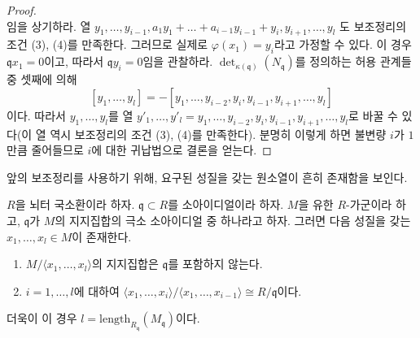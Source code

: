 \begin{proof}
$$$$
임을 상기하라. 열
$y_1, \ldots, y_{i - 1},
a_1y_1 + \ldots + a_{i - 1}y_{i - 1} + y_i, y_{i + 1}, \ldots, y_l$
도 보조정리의 조건 (3), (4)를 만족한다. 그러므로 실제로
$\varphi(x_1) = y_i$라고 가정할 수 있다. 이 경우
$\mathfrak q x_1 = 0$이고, 따라서 $\mathfrak q y_i = 0$임을
관찰하라. $\det_{\kappa(\mathfrak q)}(N_{\mathfrak q})$를 정의하는
허용 관계들 중 셋째에 의해
$$
[y_1, \ldots, y_l] =
- [y_1, \ldots, y_{i - 2}, y_i, y_{i - 1}, y_{i + 1}, \ldots, y_l]
$$
이다. 따라서 $y_1, \ldots, y_l$를 열
$y'_1, \ldots, y'_l =
y_1, \ldots, y_{i - 2}, y_i, y_{i - 1}, y_{i + 1}, \ldots, y_l$로
바꿀 수 있다(이 열 역시 보조정리의 조건 (3), (4)를 만족한다).
분명히 이렇게 하면 불변량 $i$가 $1$만큼 줄어들므로 $i$에 대한
귀납법으로 결론을 얻는다.
\end{proof}

\noindent
앞의 보조정리를 사용하기 위해, 요구된 성질을 갖는 원소열이 흔히
존재함을 보인다.

\begin{lemma}
\label{lemma-good-sequence-exists}
$R$을 뇌터 국소환이라 하자. $\mathfrak q \subset R$를
소아이디얼이라 하자. $M$을 유한 $R$-가군이라 하고,
$\mathfrak q$가 $M$의 지지집합의 극소 소아이디얼 중 하나라고 하자.
그러면 다음 성질을 갖는 $x_1, \ldots, x_l \in M$이 존재한다.
\begin{enumerate}
\item $M / \langle x_1, \ldots, x_l\rangle$의 지지집합은
$\mathfrak q$를 포함하지 않는다.
\item $i = 1, \ldots, l$에 대하여
$\langle x_1, \ldots, x_i\rangle / \langle x_1, \ldots, x_{i - 1}\rangle
\cong R/\mathfrak q$이다.
\end{enumerate}
더욱이 이 경우 $l = \text{length}_{R_\mathfrak q}(M_\mathfrak q)$이다.
\end{lemma}

